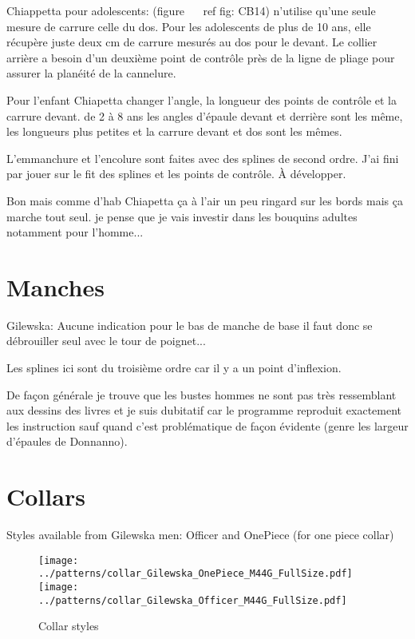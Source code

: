 \documentclass[10pt,a4paper,twoside]{report}
\begin{document}
Chiappetta pour adolescents: (figure ~ \ ref {fig: CB14}) n'utilise qu'une seule mesure de carrure celle du dos. Pour les adolescents de plus de 10 ans, elle récupère juste deux cm de carrure mesurés au dos pour le devant. Le collier arrière a besoin d'un deuxième point de contrôle près de la ligne de pliage pour assurer la planéité de la cannelure.

Pour l'enfant Chiapetta changer l'angle, la longueur des points de contrôle et la carrure devant. de 2 à 8 ans les angles d'épaule devant et derrière sont les même, les longueurs plus petites et la carrure devant et dos sont les mêmes.

L'emmanchure et l'encolure sont faites avec des splines de second ordre. J'ai fini par jouer sur le fit des splines et les points de contrôle. À développer.

Bon mais comme d'hab Chiapetta ça à l'air un peu ringard sur les bords mais ça marche tout seul. je pense que je vais investir dans
les bouquins adultes notamment pour l'homme...


\section{Manches}
Gilewska: Aucune indication pour le bas de manche de base il faut donc
se débrouiller seul avec le tour de poignet...

Les splines ici sont du troisième ordre car il y a un point d'inflexion.


De façon générale je trouve que les bustes hommes ne sont pas très ressemblant aux dessins des livres et je suis dubitatif car le programme reproduit exactement les instruction sauf quand c'est problématique de façon évidente (genre les largeur d'épaules de Donnanno).


\section{Collars}
Styles available from Gilewska men: Officer and OnePiece (for one piece collar)

\begin{figure}
\begin{center}
\texttt{[image: ../patterns/collar\_Gilewska\_OnePiece\_M44G\_FullSize.pdf]}
\texttt{[image: ../patterns/collar\_Gilewska\_Officer\_M44G\_FullSize.pdf]}
\end{center}
\caption{Collar styles}
\end{figure}
\end{document}
